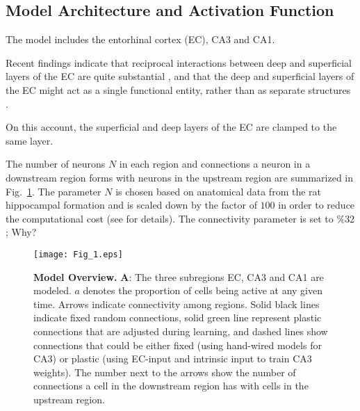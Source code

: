 \documentclass[utf8]{frontiersSCNS} %
\begin{document}
\subsection*{Model Architecture and Activation Function}


The model includes the entorhinal cortex (EC), CA3 and CA1. 


Recent findings indicate that reciprocal interactions between deep and superficial layers of the EC are quite substantial \cite{canto2008does}, and that the deep and superficial layers of the EC might act as a single functional entity, rather than as separate structures \cite{kloosterman2000functional}.

On this account, the superficial and deep layers of the EC are clamped to the same layer. 

The number of neurons $N$ in each region and connections a neuron in a downstream region forms with neurons in the upstream region are summarized in Fig.~\ref{Fig_1}. The parameter $N$ is chosen based on anatomical data from the rat hippocampal formation \cite{amaral1990chapter, cutsuridis2010hippocampal} and is scaled down by the factor of $100$ in order to reduce the computational cost (see \cite{neher2015memory} for details). The connectivity parameter is set to $\% 32$; Why? 

\begin{figure}[!htb]
\centering\texttt{[image: Fig\_1.eps]}
\caption{\textbf{Model Overview.} \textbf A: The three subregions EC, CA3 and CA1 are modeled. $a$ denotes the proportion of cells being active at any given time. Arrows indicate connectivity among regions. Solid black lines indicate fixed random connections, solid green line represent plastic connections that are adjusted during learning, and dashed lines show connections that could be either fixed (using hand-wired models for CA3) or plastic (using EC-input and intrinsic input to train CA3 weights). The number next to the arrows show the number of connections a cell in the downstream region has with cells in the upstream region.}
\label{Fig_1}
\end{figure}
\end{document}
